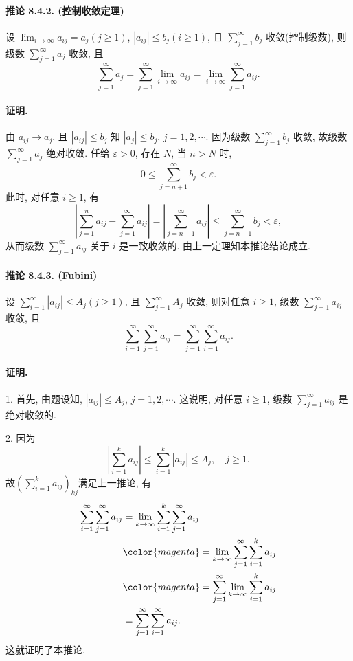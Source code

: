 \paragraph{推论 8.4.2. (控制收敛定理)}

设 $\lim_{i\rightarrow\infty}a_{ij}=a_{j}(j\geqslant1)$, $\left|a_{ij}\right|\leqslant b_{j}(i\geqslant1)$,
且 $\sum_{j=1}^{\infty}b_{j}$ 收敛(控制级数), 则级数 $\sum_{j=1}^{\infty}a_{j}$
收敛, 且 
\[
\sum_{j=1}^{\infty}a_{j}=\sum_{j=1}^{\infty}\lim_{i\rightarrow\infty}a_{ij}=\lim_{i\rightarrow\infty}\sum_{j=1}^{\infty}a_{ij}.
\]


\paragraph{证明. }

由 $a_{ij}\rightarrow a_{j}$, 且 $\left|a_{ij}\right|\leqslant b_{j}$
知 $\left|a_{j}\right|\leqslant b_{j}$, $j=1,2,\cdots$. 因为级数 $\sum_{j=1}^{\infty}b_{j}$
收敛, 故级数 $\sum_{j=1}^{\infty}a_{j}$ 绝对收敛. 任给 $\varepsilon>0$, 存在
$N$, 当 $n>N$ 时, 
\[
0\leqslant\sum_{j=n+1}^{\infty}b_{j}<\varepsilon.
\]
此时, 对任意 $i\geqslant1$, 有 
\[
\left|\sum_{j=1}^{n}a_{ij}-\sum_{j=1}^{\infty}a_{ij}\right|=\left|\sum_{j=n+1}^{\infty}a_{ij}\right|\leqslant\sum_{j=n+1}^{\infty}b_{j}<\varepsilon,
\]
从而级数 $\sum_{j=1}^{\infty}a_{ij}$ 关于 $i$ 是一致收敛的. 由上一定理知本推论结论成立.

\paragraph{推论 8.4.3. (Fubini)}

设 $\sum_{i=1}^{\infty}\left|a_{ij}\right|\leqslant A_{j}(j\geqslant1)$,
且 $\sum_{j=1}^{\infty}A_{j}$ 收敛, 则对任意 $i\geqslant1$, 级数 $\sum_{j=1}^{\infty}a_{ij}$
收敛, 且 
\[
\sum_{i=1}^{\infty}\sum_{j=1}^{\infty}a_{ij}=\sum_{j=1}^{\infty}\sum_{i=1}^{\infty}a_{ij}.
\]


\paragraph{证明. }

1. 首先, 由题设知, $\left|a_{ij}\right|\leqslant A_{j}$, $j=1,2,\cdots$.
这说明, 对任意 $i\geqslant1$, 级数 $\sum_{j=1}^{\infty}a_{ij}$ 是绝对收敛的. 

2. 因为 
\[
\left|\sum_{i=1}^{k}a_{ij}\right|\leqslant\sum_{i=1}^{k}\left|a_{ij}\right|\leqslant A_{j},\quad j\geqslant1.
\]
故$\left(\sum_{i=1}^{k}a_{ij}\right)_{kj}$满足上一推论, 有 
\[
\begin{aligned}\sum_{i=1}^{\infty}\sum_{j=1}^{\infty}a_{ij} & =\lim_{k\rightarrow\infty}\sum_{i=1}^{k}\sum_{j=1}^{\infty}a_{ij}\\
	& {\color{magenta}=\lim_{k\rightarrow\infty}\sum_{j=1}^{\infty}\sum_{i=1}^{k}a_{ij}}\\
	& {\color{magenta}=\sum_{j=1}^{\infty}\lim_{k\rightarrow\infty}\sum_{i=1}^{k}a_{ij}}\\
	& =\sum_{j=1}^{\infty}\sum_{i=1}^{\infty}a_{ij}.
\end{aligned}
\]
这就证明了本推论.

